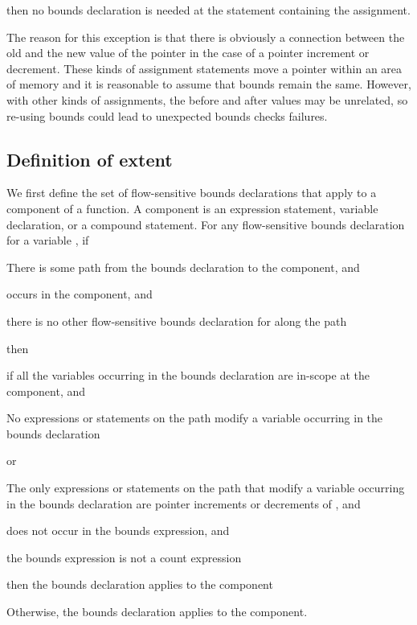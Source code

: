 then no bounds declaration is needed at the statement containing the
assignment.

The reason for this exception is that there is obviously a connection
between the old and the new value of the pointer in the case of a
pointer increment or decrement. These kinds of assignment statements
move a pointer within an area of memory and it is reasonable to assume
that bounds remain the same. However, with other kinds of assignments,
the before and after values may be unrelated, so re-using bounds could
lead to unexpected bounds checks failures.

\subsection{Definition of extent}
\label{section:extent-definition}

We first define the set of flow-sensitive bounds declarations that apply to a 
component of a function.  A component is an expression statement,
variable declaration, or a compound statement. For any flow-sensitive bounds
declaration for a variable , if

\begin{compactenum}
\item
  There is some path from the bounds declaration to the 
  component, and
\item
   occurs in the component, and
\item
  there is no other flow-sensitive bounds declaration for 
   along the path
\end{compactenum}

then

\begin{compactenum}
\item
  if all the variables occurring in the bounds declaration are 
  in-scope at the component, and
  \begin{compactenum} 
  \item No expressions or statements on the path modify a variable
  occurring in the bounds declaration
  \item or
  \begin{compactenum}
  \item The only expressions or statements on the path that
   modify a variable occurring in the bounds declaration 
   are pointer increments or decrements of , and
   \item {} does not occur in the bounds expression, and
   \item the bounds expression is not a count expression
   \end{compactenum}
   \end{compactenum}
   then the bounds declaration applies to the component   
\item 
   Otherwise, the bounds declaration 
   applies to the component.
\end{compactenum}
  
